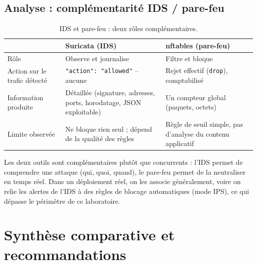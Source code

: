\documentclass[11pt,a4paper]{article}
\begin{document}
\subsection{Analyse : complémentarité IDS / pare-feu}
\begin{table}[H]
\centering
\begin{tabularx}{\textwidth}{l Y Y}
\toprule
 & \textbf{Suricata (IDS)} & \textbf{nftables (pare-feu)} \\
\midrule
Rôle & Observe et journalise & Filtre et bloque \\
Action sur le trafic détecté & \texttt{"action": "allowed"} -- aucune & Rejet effectif (\texttt{drop}), comptabilisé \\
Information produite & Détaillée (signature, adresses, ports, horodatage, JSON exploitable) & Un compteur global (paquets, octets) \\
Limite observée & Ne bloque rien seul ; dépend de la qualité des règles & Règle de seuil simple, pas d'analyse du contenu applicatif \\
\bottomrule
\end{tabularx}
\caption{IDS et pare-feu : deux rôles complémentaires.}
\end{table}

Les deux outils sont complémentaires plutôt que concurrents : l'IDS permet de comprendre une
attaque (qui, quoi, quand), le pare-feu permet de la neutraliser en temps réel. Dans un
déploiement réel, on les associe généralement, voire on relie les alertes de l'IDS à des règles
de blocage automatiques (mode IPS), ce qui dépasse le périmètre de ce laboratoire.

\section{Synthèse comparative et recommandations}
\end{document}
